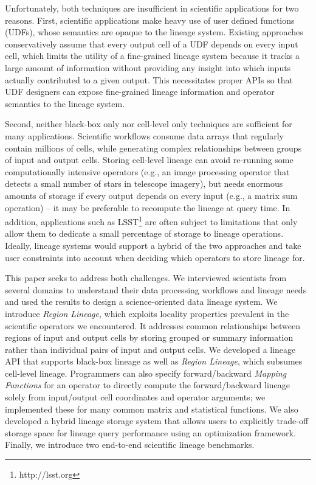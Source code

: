 Unfortunately, both techniques are insufficient in scientific
applications for two reasons. First, scientific applications make heavy use of
user defined functions (UDFs), whose semantics are opaque to the lineage
system.  Existing approaches  conservatively assume that every output cell of a
UDF depends on every input cell, which limits the utility of a fine-grained
lineage system because it tracks a large amount of information without
providing any insight into which inputs actually contributed to a given output.
This necessitates proper APIs so that UDF designers can expose fine-grained
lineage information and operator semantics to the lineage system.

Second, neither black-box only nor cell-level only techniques are sufficient
for many applications. Scientific workflows consume data arrays that regularly
contain millions of cells, while generating complex relationships between
groups of input and output cells.    Storing cell-level lineage can avoid
re-running some computationally intensive operators (e.g., an image processing
operator that detects a small number of stars in telescope imagery), but needs
enormous amounts of storage if every output depends on every input (e.g., a
matrix sum operation) -- it may be preferable to recompute the lineage at
query time.  In addition, applications such as LSST\footnote{http://lsst.org}
are often subject to  limitations that only allow them to dedicate a
small percentage of storage to lineage operations.   Ideally, lineage 
systems would support a hybrid of the two approaches and take user constraints
into account when deciding which operators to store lineage for.


This paper seeks to address both challenges. We interviewed scientists from
several domains to understand their data processing workflows and  lineage
needs and used the results to design a science-oriented data lineage system.
We introduce {\it Region Lineage}, which exploits locality properties prevalent
in the scientific operators we encountered.  It addresses common relationships
between regions of input and output cells by storing grouped or summary
information rather than individual pairs of input and output cells. We
developed a lineage API that supports black-box lineage as well as {\it Region
Lineage}, which subsumes cell-level lineage.  Programmers can also specify
forward/backward {\it Mapping Functions} for an operator to directly
compute the forward/backward lineage solely from input/output cell coordinates
and operator arguments; we implemented these for many common matrix and
statistical functions.  We also developed a hybrid lineage storage
system that allows users to explicitly trade-off storage space for lineage
query performance using an optimization framework.  Finally, we introduce two
end-to-end scientific lineage benchmarks.

